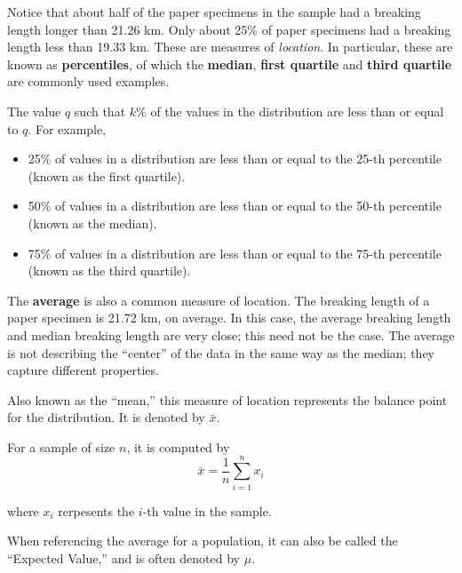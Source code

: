\documentclass[]{book}
\providecommand{\tightlist}{%
  \setlength{\itemsep}{0pt}\setlength{\parskip}{0pt}}
\theoremstyle{definition}
\theoremstyle{definition}
\theoremstyle{definition}
\theoremstyle{remark}
\let\BeginKnitrBlock\begin \let\EndKnitrBlock\end
\begin{document}
Notice that about half of the paper specimens in the sample had a
breaking length longer than 21.26 km. Only about 25\% of paper specimens
had a breaking length less than 19.33 km. These are measures of
\emph{location}. In particular, these are known as \textbf{percentiles},
of which the \textbf{median}, \textbf{first quartile} and \textbf{third
quartile} are commonly used examples.

\BeginKnitrBlock{definition}[Percentile]
\protect\hypertarget{def:defn-percentile}{}{\label{def:defn-percentile}
{} }The value \(q\) such that \(k\)\% of the
values in the distribution are less than or equal to \(q\). For example,

\begin{itemize}
\tightlist
\item
  25\% of values in a distribution are less than or equal to the 25-th
  percentile (known as the first quartile).
\item
  50\% of values in a distribution are less than or equal to the 50-th
  percentile (known as the median).
\item
  75\% of values in a distribution are less than or equal to the 75-th
  percentile (known as the third quartile).
\end{itemize}
\EndKnitrBlock{definition}

The \textbf{average} is also a common measure of location. The breaking
length of a paper specimen is 21.72 km, on average. In this case, the
average breaking length and median breaking length are very close; this
need not be the case. The average is not describing the ``center'' of
the data in the same way as the median; they capture different
properties.

\BeginKnitrBlock{definition}[Average]
\protect\hypertarget{def:defn-average}{}{\label{def:defn-average}
{} }Also known as the ``mean,'' this measure of
location represents the balance point for the distribution. It is
denoted by \(\bar{x}\).

For a sample of size \(n\), it is computed by
\[\bar{x} = \frac{1}{n}\sum_{i=1}^{n} x_i\]

where \(x_i\) rerpesents the \(i\)-th value in the sample.

When referencing the average for a population, it can also be called the
``Expected Value,'' and is often denoted by \(\mu\).
\EndKnitrBlock{definition}
\end{document}
